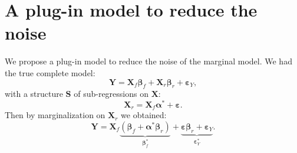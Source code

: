 \documentclass[12pt,a4paper]{report}
\begin{document}
\section{A plug-in model  to reduce the noise}	
	We propose a plug-in model to reduce the noise of the marginal model.
	We had the true complete model:
\begin{equation}
		\boldsymbol{Y}%
		= \boldsymbol{X}_f\boldsymbol{\beta}_f+\boldsymbol{X}_r\boldsymbol{\beta}_r+\boldsymbol{\varepsilon}_Y, \nonumber 
\end{equation}		
	with a structure $\boldsymbol{S}$ of sub-regressions on $\boldsymbol{X}$:
	\begin{equation}
		\boldsymbol{X}_r 
		=\boldsymbol{X}_f\boldsymbol{\alpha}^*+\boldsymbol{\varepsilon}. \label{ssregplugin}
	\end{equation}
Then by marginalization on $\boldsymbol{X}_r$ we obtained:
		\begin{equation}
		\boldsymbol{Y}%
		= \boldsymbol{X}_f\underbrace{(\boldsymbol{\beta}_f+\boldsymbol{\alpha}^*\boldsymbol{\beta}_r)}_{\boldsymbol{\beta}^*_f}+\underbrace{\boldsymbol{\varepsilon}\boldsymbol{\beta}_r+\boldsymbol{\varepsilon}_Y}_{\boldsymbol{\varepsilon}_Y^*}.  \label{pluginorig}
		\end{equation}
\end{document}
